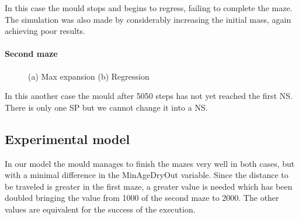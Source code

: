 In this case the mould stops and begins to regress, failing to complete the maze. The simulation was also made by considerably increasing the initial mass, again achieving poor results.

\paragraph{Second maze}

\begin{figure}[H]
    \centering
    \caption{(a) Max expansion (b) Regression}
    \label{fig:foobar}
\end{figure}

In this another case the mould after 5050 steps has not yet reached the first NS. There is only one SP but we cannot change it into a NS.

\subsection{Experimental model}

In our model the mould manages to finish the mazes very well in both cases, but with a minimal difference in the MinAgeDryOut variable. Since the distance to be traveled is greater in the first maze, a greater value is needed which has been doubled bringing the value from 1000 of the second maze to 2000. The other values are equivalent for the success of the execution.

